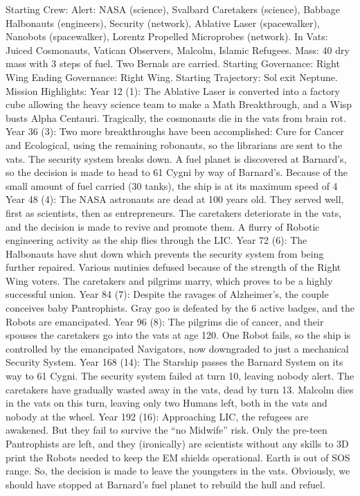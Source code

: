 \documentclass[a4paper]{book}
\begin{document}
Starting Crew: Alert: NASA (science), Svalbard Caretakers (science), Babbage Halbonauts (engineers), Security (network), Ablative Laser (spacewalker), Nanobots (spacewalker), Lorentz Propelled Microprobes (network).
In Vats: Juiced Cosmonauts, Vatican Observers, Malcolm, Islamic Refugees.
Mass: 40 dry mass with 3 steps of fuel. Two Bernals are carried.
Starting Governance: Right Wing Ending Governance: Right Wing.
Starting Trajectory: Sol exit Neptune.
Mission Highlights:
Year 12 (1): The Ablative Laser is converted into a factory cube allowing the heavy science team to make a Math Breakthrough, and a Wisp busts Alpha Centauri. Tragically, the cosmonauts die in the vats from brain rot.
Year 36 (3): Two more breakthroughs have been accomplished: Cure for Cancer and  Ecological, using the remaining robonauts, so the librarians are sent to the vats. The security system breaks down. A fuel planet is discovered at Barnard’s, so the decision is made to head to 61 Cygni by way of Barnard’s. Because of the small amount of fuel carried (30 tanks), the ship is at its maximum speed of 4%
Year 48 (4): The NASA astronauts are dead at 100 years old. They served well, first as scientists, then as entrepreneurs. The caretakers deteriorate in the vats, and the decision is made to revive and promote them. A flurry of Robotic engineering activity as the ship flies through the LIC.
Year 72 (6): The Halbonauts have shut down which prevents the security system from being further repaired. Various mutinies defused because of the strength of the Right Wing voters. The caretakers and pilgrims marry, which proves to be a highly successful union.
Year 84 (7): Despite the ravages of Alzheimer’s, the couple conceives baby Pantrophists. Gray goo is defeated by the 6 active badges, and the Robots are emancipated.
Year 96 (8): The pilgrims die of cancer, and their spouses the caretakers go into the vats at age 120. One Robot fails, so the ship is controlled by the emancipated Navigators, now downgraded to just a mechanical Security System.
Year 168 (14): The Starship passes the Barnard System on its way to 61 Cygni. The security system failed at turn 10, leaving nobody alert. The caretakers have gradually wasted away in the vats, dead by turn 13. Malcolm dies in the vats on this turn, leaving only two Humans left, both in the vats and nobody at the wheel.
Year 192 (16): Approaching LIC, the refugees are awakened. But they fail to survive the “no Midwife” risk. Only the pre-teen Pantrophists are left, and they (ironically) are scientists without any skills to 3D print the Robots needed to keep the EM shields operational. Earth is out of SOS range. So, the decision is made to leave the youngsters in the vats. Obviously, we should have stopped at Barnard’s fuel planet to rebuild the hull and refuel.
\end{document}
